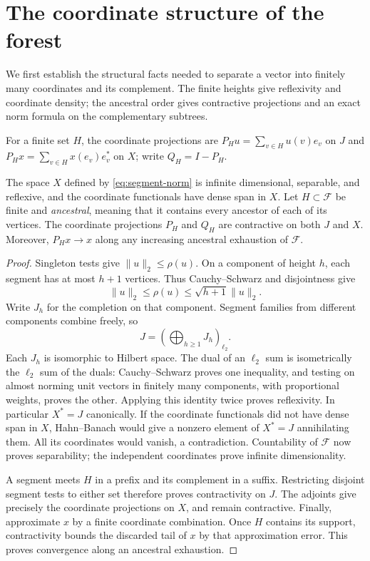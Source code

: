 \section{The coordinate structure of the forest}\label{sec:forest}

We first establish the structural facts needed to separate a vector
into finitely many coordinates and its complement. The finite heights
give reflexivity and coordinate density; the ancestral order gives
contractive projections and an exact norm formula on the complementary
subtrees.

For a finite set $H$, the coordinate projections are
$P_Hu=\sum_{v\in H}u(v)e_v$ on $J$ and
$P_Hx=\sum_{v\in H}x(e_v)e_v^*$ on $X$; write $Q_H=I-P_H$.

\begin{lemma}\label{lem:forest-structure}
The space $X$ defined by \eqref{eq:segment-norm} is infinite dimensional,
separable, and reflexive, and the coordinate functionals have dense span
in $X$. Let $H\subset\mathcal F$ be finite and \emph{ancestral}, meaning
that it contains every ancestor of each of its vertices. The coordinate
projections $P_H$ and $Q_H$ are contractive on both $J$ and $X$.
Moreover, $P_Hx\to x$ along any increasing ancestral exhaustion of
$\mathcal F$.
\end{lemma}

\begin{proof}
Singleton tests give $\|u\|_2\le\rho(u)$. On a component of height
$h$, each segment has at most $h+1$ vertices. Thus Cauchy--Schwarz and
disjointness give
\[
 \|u\|_2\le\rho(u)\le\sqrt{h+1}\|u\|_2.
\]
Write $J_h$ for the completion on that component. Segment families
from different components combine freely, so
\[
 J=\left(\bigoplus_{h\ge1}J_h\right)_{\ell_2}.
\]
Each $J_h$ is isomorphic to Hilbert space. The dual of an $\ell_2$
sum is isometrically the $\ell_2$ sum of the duals: Cauchy--Schwarz
proves one inequality, and testing on almost norming unit vectors in
finitely many components, with proportional weights, proves the other.
Applying this identity twice proves reflexivity. In particular $X^*=J$
canonically. If the coordinate functionals did not have dense span in
$X$, Hahn--Banach would give a nonzero element of $X^*=J$ annihilating
them. All its coordinates would vanish, a contradiction. Countability
of $\mathcal F$ now proves separability; the independent coordinates
prove infinite dimensionality.

A segment meets $H$ in a prefix and its complement in a suffix.
Restricting disjoint segment tests to either set therefore proves
contractivity on $J$. The adjoints give precisely the coordinate
projections on $X$, and remain contractive. Finally, approximate $x$
by a finite coordinate combination. Once $H$ contains its support,
contractivity bounds the discarded tail of $x$ by that approximation
error. This proves convergence along an ancestral exhaustion.
\end{proof}

